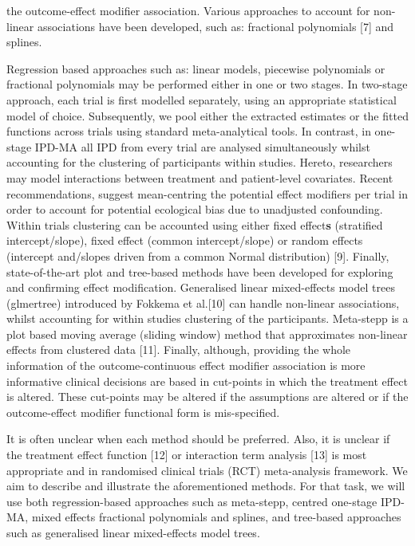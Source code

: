\documentclass[14pt,]{article}
\begin{document}
the outcome-effect modifier association. Various approaches to account
for non-linear associations have been developed, such as: fractional
polynomials {[}7{]} and splines. \par      Regression based approaches
such as: linear models, piecewise polynomials or fractional polynomials
may be performed either in one or two stages. In two-stage approach,
each trial is first modelled separately, using an appropriate
statistical model of choice. Subsequently, we pool either the extracted
estimates or the fitted functions across trials using standard
meta-analytical tools. In contrast, in one-stage IPD-MA all IPD from
every trial are analysed simultaneously whilst accounting for the
clustering of participants within studies. Hereto, researchers may model
interactions between treatment and patient-level covariates. Recent
recommendations, suggest mean-centring the potential effect modifiers
per trial in order to account for potential ecological bias due to
unadjusted confounding. Within trials clustering can be accounted using
either fixed effect\textbf{s} (stratified intercept/slope), fixed effect
(common intercept/slope) or random effects (intercept and/slopes driven
from a common Normal distribution) {[}9{]}. Finally, state-of-the-art
plot and tree-based methods have been developed for exploring and
confirming effect modification. Generalised linear mixed-effects model
trees (glmertree) introduced by Fokkema et al.{[}10{]} can handle
non-linear associations, whilst accounting for within studies clustering
of the participants. Meta-stepp is a plot based moving average (sliding
window) method that approximates non-linear effects from clustered data
{[}11{]}. Finally, although, providing the whole information of the
outcome-continuous effect modifier association is more informative
clinical decisions are based in cut-points in which the treatment effect
is altered. These cut-points may be altered if the assumptions are
altered or if the outcome-effect modifier functional form is
mis-specified. \par
 It is often unclear when each method should be preferred. Also, it is
unclear if the treatment effect function {[}12{]} or interaction term
analysis {[}13{]} is most appropriate and in randomised clinical trials
(RCT) meta-analysis framework. We aim to describe and illustrate the
aforementioned methods. For that task, we will use both regression-based
approaches such as meta-stepp, centred one-stage IPD-MA, mixed effects
fractional polynomials and splines, and tree-based approaches such as
generalised linear mixed-effects model trees.
\end{document}
